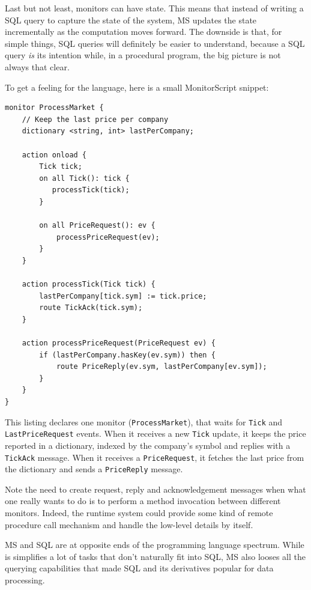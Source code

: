 \documentclass{report}
\begin{document}
Last but not least, monitors can have state. This means that instead
of writing a SQL query to capture the state of the system, MS updates
the state incrementally as the computation moves forward. The downside
is that, for simple things, SQL queries will definitely be easier to
understand, because a SQL query \emph{is} its intention while, in a
procedural program, the big picture is not always that clear.

To get a feeling for the language, here is a small MonitorScript
snippet:

\lstset{
  language=MonitorScript,
  columns=fullflexible,
  basicstyle=\tt,
  keywordstyle=[1]\bf,
  keywordstyle=[2]\it,
}


\begin{lstlisting}
monitor ProcessMarket {
    // Keep the last price per company
    dictionary <string, int> lastPerCompany;

    action onload {
        Tick tick;
        on all Tick(): tick {
           processTick(tick);
        }

        on all PriceRequest(): ev {
            processPriceRequest(ev);
        }
    }

    action processTick(Tick tick) {
        lastPerCompany[tick.sym] := tick.price;
        route TickAck(tick.sym);
    }

    action processPriceRequest(PriceRequest ev) {
        if (lastPerCompany.hasKey(ev.sym)) then {
            route PriceReply(ev.sym, lastPerCompany[ev.sym]);
        }
    }
}
\end{lstlisting}

This listing declares one monitor (\verb=ProcessMarket=), that waits
for \verb=Tick= and \verb=LastPriceRequest= events. When it receives a
new \verb=Tick= update, it keeps the price reported in a dictionary,
indexed by the company's symbol and replies with a \verb=TickAck=
message. When it receives a \verb=PriceRequest=, it fetches the last
price from the dictionary and sends a \verb=PriceReply= message.

Note the need to create request, reply and acknowledgement messages
when what one really wants to do is to perform a method invocation
between different monitors. Indeed, the runtime system could provide
some kind of remote procedure call mechanism and handle the low-level
details by itself.

MS and SQL are at opposite ends of the programming language
spectrum. While is simplifies a lot of tasks that don't naturally fit
into SQL, MS also looses all the querying capabilities that made SQL
and its derivatives popular for data processing.
\end{document}
